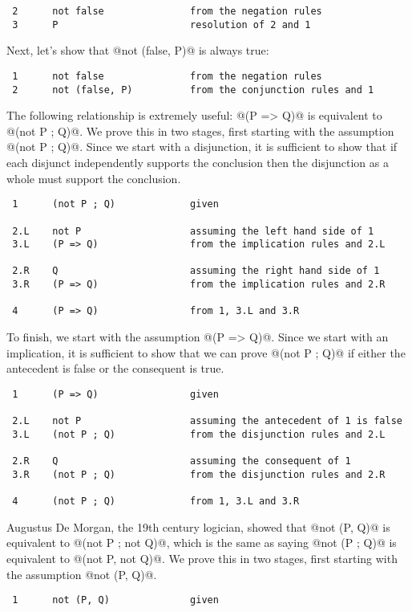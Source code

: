 \begin{itemize}
\begin{verbatim}
 2      not false               from the negation rules
 3      P                       resolution of 2 and 1
\end{verbatim}

Next, let's show that @not (false, P)@ is always true:
\begin{verbatim}
 1      not false               from the negation rules
 2      not (false, P)          from the conjunction rules and 1
\end{verbatim}

The following relationship is extremely useful: @(P => Q)@ is equivalent
to @(not P ; Q)@.  We prove this in two stages, first starting with the
assumption @(not P ; Q)@.
Since we start with a disjunction, it is sufficient to show that if each
disjunct independently supports the conclusion then the disjunction as a
whole must support the conclusion.
\begin{verbatim}
 1      (not P ; Q)             given

 2.L    not P                   assuming the left hand side of 1
 3.L    (P => Q)                from the implication rules and 2.L

 2.R    Q                       assuming the right hand side of 1
 3.R    (P => Q)                from the implication rules and 2.R

 4      (P => Q)                from 1, 3.L and 3.R
\end{verbatim}
To finish, we start with the assumption @(P => Q)@.  Since we start with
an implication, it is sufficient to show that we can prove @(not P ; Q)@
if either the antecedent is false or the consequent is true.
\begin{verbatim}
 1      (P => Q)                given

 2.L    not P                   assuming the antecedent of 1 is false
 3.L    (not P ; Q)             from the disjunction rules and 2.L

 2.R    Q                       assuming the consequent of 1
 3.R    (not P ; Q)             from the disjunction rules and 2.R

 4      (not P ; Q)             from 1, 3.L and 3.R
\end{verbatim}

Augustus De Morgan, the 19th century logician, showed that @not (P, Q)@
is equivalent to @(not P ; not Q)@, which is the same as saying
@not (P ; Q)@ is equivalent to @(not P, not Q)@.  We prove this in two
stages, first starting with the assumption @not (P, Q)@.
\begin{verbatim}
 1      not (P, Q)              given


\end{verbatim}
\end{itemize}
